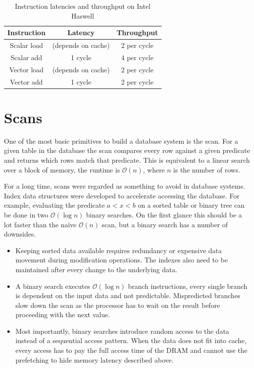 \begin{table}\center
\begin{tabular}{c|c|c}
Instruction & Latency & Throughput\\
\hline
Scalar load & (depends on cache) & 2 per cycle\\
Scalar add & 1 cycle & 4 per cycle\\
Vector load & (depends on cache) & 2 per cycle\\
Vector add & 1 cycle & 2 per cycle\\
\end{tabular}
\caption{Instruction latencies and throughput on Intel Haswell \cite{agnertables}}
\label{tab:latencies}
\end{table}

\newpage
\section{Scans}

One of the most basic primitives to build a database system is the scan. For a
given table in the database the scan compares every row against a given
predicate and returns which rows match that predicate. This is equivalent to a
linear search over a block of memory, the runtime is $\mathcal{O}(n)$, where $n$
is the number of rows.

For a long time, scans were regarded as something to avoid in database systems.
Index data structures were developed to accelerate accessing the database. For
example, evaluating the predicate $a < x < b$ on a sorted table or binary tree
can be done in two $\mathcal{O}(\log n)$ binary searches. On the first glance
this should be a lot faster than the na\"ive $\mathcal{O}(n)$ scan, but a binary
search has a number of downsides.

\begin{itemize}
  \item Keeping sorted data available requires redundancy or expensive data
    movement during modification operations. The indexes also need to be
    maintained after every change to the underlying data.
  \item A binary search executes $\mathcal{O}(\log n)$ branch instructions,
    every single branch is dependent on the input data and not predictable.
    Mispredicted branches slow down the scan as the processor has to wait on the
    result before proceeding with the next value.
  \item Most importantly, binary searches introduce random access to the data
    instead of a sequential access pattern. When the data does not fit into
    cache, every access has to pay the full access time of the DRAM and cannot
    use the prefetching to hide memory latency described above.
\end{itemize}

